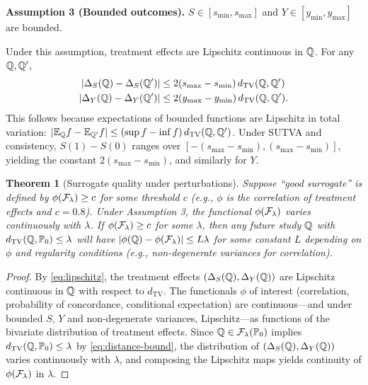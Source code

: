 \documentclass{article}
\newtheorem{theorem}{Theorem}
\newcommand{\PP}{\mathbb{P}}
\begin{document}
\noindent\textbf{Assumption 3 (Bounded outcomes).}
$S \in [s_{\min}, s_{\max}]$ and $Y \in [y_{\min}, y_{\max}]$ are bounded.

Under this assumption, treatment effects are Lipschitz continuous in $\mathbb{Q}$. For any $\mathbb{Q}, \mathbb{Q}'$,
\begin{align}\label{eq:lipschitz}
    |\Delta_S(\mathbb{Q}) - \Delta_S(\mathbb{Q}')| &\leq 2(s_{\max} - s_{\min}) \, d_{\mathrm{TV}}(\mathbb{Q}, \mathbb{Q}')\\
    |\Delta_Y(\mathbb{Q}) - \Delta_Y(\mathbb{Q}')| &\leq 2(y_{\max} - y_{\min}) \, d_{\mathrm{TV}}(\mathbb{Q}, \mathbb{Q}'). \nonumber
\end{align}
This follows because expectations of bounded functions are Lipschitz in total variation: $|\mathbb{E}_{\mathbb{Q}} f - \mathbb{E}_{\mathbb{Q}'} f| \leq (\sup f - \inf f) \, d_{\mathrm{TV}}(\mathbb{Q}, \mathbb{Q}')$. Under SUTVA and consistency, $S(1) - S(0)$ ranges over $[-(s_{\max} - s_{\min}), (s_{\max} - s_{\min})]$, yielding the constant $2(s_{\max} - s_{\min})$, and similarly for $Y$.

\begin{theorem}[Surrogate quality under perturbations]\label{thm:epsilon}
Suppose ``good surrogate'' is defined by $\phi(\mathcal{F}_\lambda) \geq c$ for some threshold $c$ (e.g., $\phi$ is the correlation of treatment effects and $c = 0.8$). Under Assumption 3, the functional $\phi(\mathcal{F}_\lambda)$ varies continuously with $\lambda$. If $\phi(\mathcal{F}_\lambda) \geq c$ for some $\lambda$, then any future study $\mathbb{Q}$ with $d_{\mathrm{TV}}(\Q, \PP_0) \leq \lambda$ will have $|\phi(\mathbb{Q}) - \phi(\mathcal{F}_\lambda)| \leq L \lambda$ for some constant $L$ depending on $\phi$ and regularity conditions (e.g., non-degenerate variances for correlation).
\end{theorem}
\begin{proof}
By \eqref{eq:lipschitz}, the treatment effects $(\Delta_S(\mathbb{Q}), \Delta_Y(\mathbb{Q}))$ are Lipschitz continuous in $\mathbb{Q}$ with respect to $d_{\mathrm{TV}}$. The functionals $\phi$ of interest (correlation, probability of concordance, conditional expectation) are continuous---and under bounded $S$, $Y$ and non-degenerate variances, Lipschitz---as functions of the bivariate distribution of treatment effects. Since $\Q \in \cF_\lambda(\PP_0)$ implies $d_{\mathrm{TV}}(\Q, \PP_0) \leq \lambda$ by \eqref{eq:distance-bound}, the distribution of $(\Delta_S(\mathbb{Q}), \Delta_Y(\mathbb{Q}))$ varies continuously with $\lambda$, and composing the Lipschitz maps yields continuity of $\phi(\mathcal{F}_\lambda)$ in $\lambda$.
\end{proof}
\end{document}
